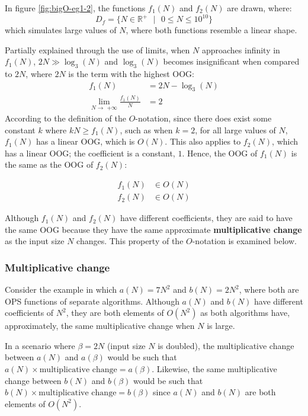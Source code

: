 \documentclass[12pt]{article}
\begin{document}
In figure \ref{fig:bigO-eg1-2}, the functions $f_1(N)$ and $f_2(N)$ are drawn, where:
\[D_f = \{N \in \mathbb{R}^+ \text{ }|\text{ } 0\leq N \leq 10^{10}\}\]
which simulates large values of $N$, where both functions resemble a linear shape.\newline

Partially explained through the use of limits, when $N$ approaches infinity in $f_1(N)$, $2N\gg \log_3(N)$ and $\log_3(N)$ becomes insignificant when compared to $2N$, where $2N$ is the term with the highest OOG:\vspace{-1em}
\begin{align*}
    f_1(N)&=2N-\log_3(N)\\
    \lim_{N\to\text{ +}\infty} \frac{f_1(N)}{N}&=2
\end{align*}
According to the definition of the $O$-notation, since there does exist some constant $k$ where $kN \geq f_1(N)$, such as when $k=2$, for all large values of $N$, $f_1(N)$ has a linear OOG, which is $O(N)$. This also applies to $f_2(N)$, which has a linear OOG; the coefficient is a constant, $1$. Hence, the OOG of $f_1(N)$ is the same as the OOG of $f_2(N)$:

\vspace{-3em}
\begin{align*}
    f_1(N)&\in O(N)\\
    f_2(N)&\in O(N)
\end{align*}

Although $f_1(N)$ and $f_2(N)$ have different coefficients, they are said to have the same OOG because they have the same approximate \textbf{multiplicative change} as the input size $N$ changes. This property of the $O$-notation is examined below.

\subsubsection{Multiplicative change}
Consider the example in which $a(N) = 7N^2$ and $b(N) = 2N^2$, where both are OPS functions of separate algorithms. Although $a(N)$ and $b(N)$ have different coefficients of $N^2$, they are both elements of $O(N^2)$ as both algorithms have, approximately, the same multiplicative change when $N$ is large.\newline

In a scenario where $\beta=2N$ (input size $N$ is doubled), the multiplicative change between $a(N)$ and $a(\beta)$ would be such that $a(N) \times \text{multiplicative change} = a(\beta)$. Likewise, the same multiplicative change between $b(N)$ and $b(\beta)$ would be such that $b(N) \times \text{multiplicative change} = b(\beta)$ since $a(N)$ and $b(N)$ are both elements of $O(N^2)$.\newline
\end{document}
